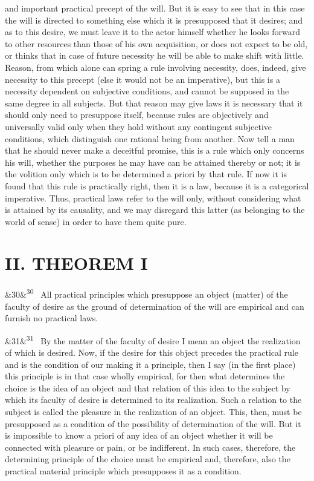 \documentclass[12pt]{article}
\newcommand{\para}[1][]{\par\noindent\ifx&#1&\else\textsuperscript{\footnotesize #1}~\fi}
\begin{document}
and important practical precept of the will. But it is easy to see that in this case the will is directed to something else which it is presupposed that it desires; and as to this desire, we must leave it to the actor himself whether he looks forward to other resources than those of his own acquisition, or does not expect to be old, or thinks that in case of future necessity he will be able to make shift with little. Reason, from which alone can spring a rule involving necessity, does, indeed, give necessity to this precept (else it would not be an imperative), but this is a necessity dependent on subjective conditions, and cannot be supposed in the same degree in all subjects. But that reason may give laws it is necessary that it should only need to presuppose itself, because rules are objectively and universally valid only when they hold without any contingent subjective conditions, which distinguish one rational being from another. Now tell a man that he should never make a deceitful promise, this is a rule which only concerns his will, whether the purposes he may have can be attained thereby or not; it is the volition only which is to be determined a priori by that rule. If now it is found that this rule is practically right, then it is a law, because it is a categorical imperative. Thus, practical laws refer to the will only, without considering what is attained by its causality, and we may disregard this latter (as belonging to the world of sense) in order to have them quite pure.

\section*{II. THEOREM I}

\para[30] All practical principles which presuppose an object (matter) of the faculty of desire as the ground of determination of the will are empirical and can furnish no practical laws.

\para[31] By the matter of the faculty of desire I mean an object the realization of which is desired. Now, if the desire for this object precedes the practical rule and is the condition of our making it a principle, then I say (in the first place) this principle is in that case wholly empirical, for then what determines the choice is the idea of an object and that relation of this idea to the subject by which its faculty of desire is determined to its realization. Such a relation to the subject is called the pleasure in the realization of an object. This, then, must be presupposed as a condition of the possibility of determination of the will. But it is impossible to know a priori of any idea of an object whether it will be connected with pleasure or pain, or be indifferent. In such cases, therefore, the determining principle of the choice must be empirical and, therefore, also the practical material principle which presupposes it as a condition.
\end{document}

